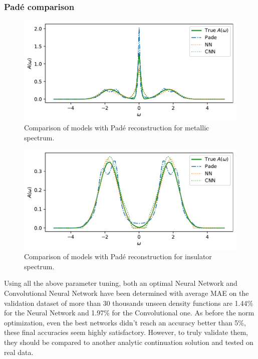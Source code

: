 \documentclass[reprint,amsmath,amssymb,aps,pra]{revtex4-2}
\begin{document}
\subsubsection{Padé comparison}

\begin{figure}[H]
\includegraphics[width=\columnwidth]{analytical_continuation/pade_comp_metal.pdf}
\caption{\label{fig:compa_metal}Comparison of models with Padé reconstruction for metallic spectrum.}
\end{figure}
\begin{figure}[H]
\includegraphics[width=\columnwidth]{analytical_continuation/pade_comp_isolant.pdf}
\caption{\label{fig:compa_isolant}Comparison of models with Padé reconstruction for insulator spectrum.}
\end{figure}

Using all the above parameter tuning, both an optimal Neural Network and Convolutional Neural Network have been determined with average MAE on the validation dataset of more than 30 thousands unseen density functions are 1.44\% for the Neural Network and 1.97\% for the Convolutional one. As before the norm optimization, even the best networks didn't reach an accuracy better than 5\%, these final accuracies seem highly satisfactory. However, to truly validate them, they should be compared to another analytic continuation solution and tested on real data.
\end{document}

